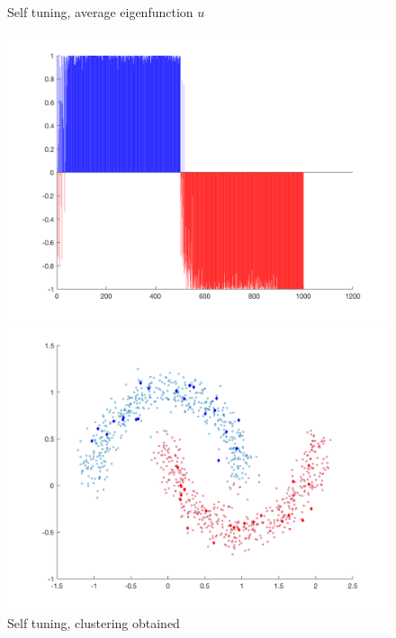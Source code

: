 \documentclass{siamart1116}
\begin{document}
\begin{figure}[!htb]
    \begin{minipage}{0.48\textwidth}
        \centering
        \caption{\label{fig:noncentered_selftuning_avg} Self tuning, average eigenfunction $u$}
        \includegraphics[width=\linewidth]{graphics/moons/noncentered_selftuning/final_avg.png}
    \end{minipage} \hfill
    \begin{minipage}{0.48\textwidth}
        \centering
        \caption{\label{fig:noncentered_selftuning_scatter} Self tuning, clustering obtained}
        \includegraphics[width=\linewidth]{graphics/moons/noncentered_selftuning/final_scatter.png}
    \end{minipage}
\end{figure}
\end{document}
